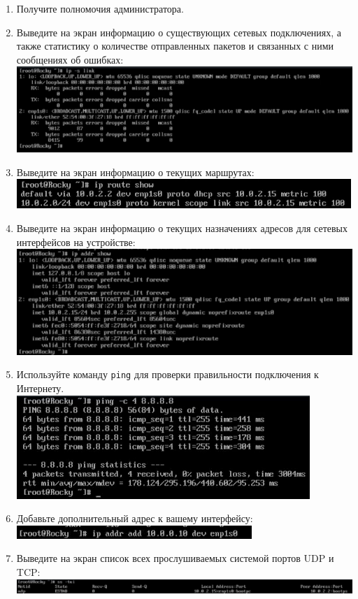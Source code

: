 \documentclass[12pt]{article}
\begin{document}
\begin{enumerate}
	\item Получите полномочия администратора.
	\item Выведите на экран информацию о существующих сетевых подключениях, а также статистику о количестве отправленных пакетов и связанных с ними сообщениях об ошибках:
	      \\\includegraphics{1.png}
	\item Выведите на экран информацию о текущих маршрутах:
	      \\\includegraphics{2.png}
	\item Выведите на экран информацию о текущих назначениях адресов для сетевых интерфейсов на устройстве:
	      \\\includegraphics{3.png}
	\item Используйте команду \texttt{ping} для проверки правильности подключения к Интернету.
	      \\\includegraphics{4.png}
	\item Добавьте дополнительный адрес к вашему интерфейсу:
	      \\\includegraphics{5.png}
	\item Выведите на экран список всех прослушиваемых системой портов UDP и TCP:
	      \\\includegraphics{6.png}
\end{enumerate}
\end{document}
